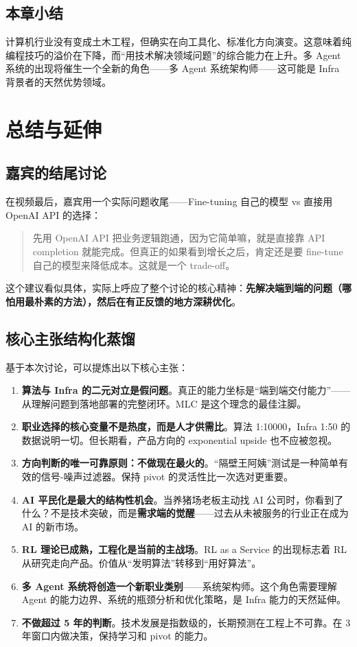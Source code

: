 \documentclass[a4paper]{article}
\begin{document}
\subsection{本章小结}

计算机行业没有变成土木工程，但确实在向工具化、标准化方向演变。这意味着纯编程技巧的溢价在下降，而``用技术解决领域问题''的综合能力在上升。多 Agent 系统的出现将催生一个全新的角色——多 Agent 系统架构师——这可能是 Infra 背景者的天然优势领域。


\section{总结与延伸}

\subsection{嘉宾的结尾讨论}

在视频最后，嘉宾用一个实际问题收尾——Fine-tuning 自己的模型 vs 直接用 OpenAI API 的选择：

\begin{quote}
先用 OpenAI API 把业务逻辑跑通，因为它简单嘛，就是直接靠 API completion 就能完成。但真正的如果看到增长之后，肯定还是要 fine-tune 自己的模型来降低成本。这就是一个 trade-off。
\end{quote}

这个建议看似具体，实际上呼应了整个讨论的核心精神：\textbf{先解决端到端的问题（哪怕用最朴素的方法），然后在有正反馈的地方深耕优化}。

\subsection{核心主张结构化蒸馏}

基于本次讨论，可以提炼出以下核心主张：

\begin{enumerate}
    \item \textbf{算法与 Infra 的二元对立是假问题}。真正的能力坐标是``端到端交付能力''——从理解问题到落地部署的完整闭环。MLC 是这个理念的最佳注脚。
    \item \textbf{职业选择的核心变量不是热度，而是人才供需比}。算法 1:10000，Infra 1:50 的数据说明一切。但长期看，产品方向的 exponential upside 也不应被忽视。
    \item \textbf{方向判断的唯一可靠原则：不做现在最火的}。``隔壁王阿姨''测试是一种简单有效的信号-噪声过滤器。保持 pivot 的灵活性比一次选对更重要。
    \item \textbf{AI 平民化是最大的结构性机会}。当养猪场老板主动找 AI 公司时，你看到了什么？不是技术突破，而是\textbf{需求端的觉醒}——过去从未被服务的行业正在成为 AI 的新市场。
    \item \textbf{RL 理论已成熟，工程化是当前的主战场}。RL as a Service 的出现标志着 RL 从研究走向产品。价值从``发明算法''转移到``用好算法''。
    \item \textbf{多 Agent 系统将创造一个新职业类别}——系统架构师。这个角色需要理解 Agent 的能力边界、系统的瓶颈分析和优化策略，是 Infra 能力的天然延伸。
    \item \textbf{不做超过 5 年的判断}。技术发展是指数级的，长期预测在工程上不可靠。在 3 年窗口内做决策，保持学习和 pivot 的能力。
\end{enumerate}
\end{document}
